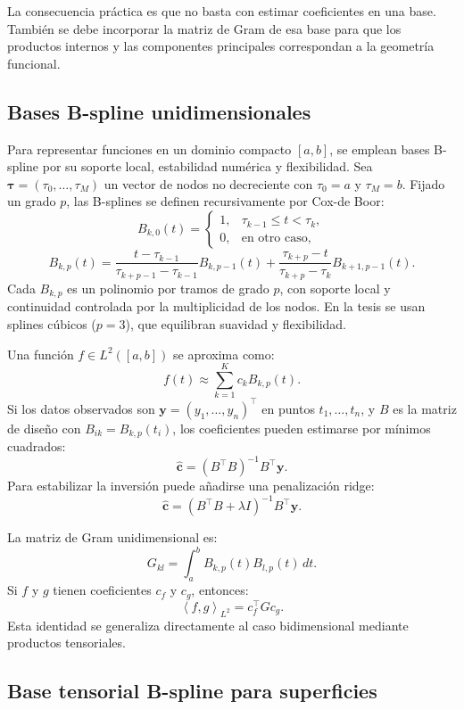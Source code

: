 \documentclass[a4paper,11pt]{article}
\newcommand{\inner}[2]{\left\langle #1,#2 \right\rangle}
\begin{document}
La consecuencia práctica es que no basta con estimar coeficientes en una base. También se debe incorporar la matriz de Gram de esa base para que los productos internos y las componentes principales correspondan a la geometría funcional.

\subsection{Bases B-spline unidimensionales}

Para representar funciones en un dominio compacto \([a,b]\), se emplean bases B-spline por su soporte local, estabilidad numérica y flexibilidad. Sea \(\boldsymbol{\tau}=(\tau_0,\ldots,\tau_M)\) un vector de nodos no decreciente con \(\tau_0=a\) y \(\tau_M=b\). Fijado un grado \(p\), las B-splines se definen recursivamente por Cox-de Boor:
\[
B_{k,0}(t)=
\begin{cases}
1, & \tau_{k-1}\leq t<\tau_k,\\
0, & \text{en otro caso},
\end{cases}
\]
\[
B_{k,p}(t)=
\frac{t-\tau_{k-1}}{\tau_{k+p-1}-\tau_{k-1}}B_{k,p-1}(t)
+
\frac{\tau_{k+p}-t}{\tau_{k+p}-\tau_k}B_{k+1,p-1}(t).
\]
Cada \(B_{k,p}\) es un polinomio por tramos de grado \(p\), con soporte local y continuidad controlada por la multiplicidad de los nodos. En la tesis se usan splines cúbicos (\(p=3\)), que equilibran suavidad y flexibilidad.

Una función \(f\in L^2([a,b])\) se aproxima como:
\[
  f(t)\approx \sum_{k=1}^{K} c_k B_{k,p}(t).
\]
Si los datos observados son \(\mathbf{y}=(y_1,\ldots,y_n)^\top\) en puntos \(t_1,\ldots,t_n\), y \(B\) es la matriz de diseño con \(B_{ik}=B_{k,p}(t_i)\), los coeficientes pueden estimarse por mínimos cuadrados:
\[
  \widehat{\mathbf{c}}=(B^\top B)^{-1}B^\top \mathbf{y}.
\]
Para estabilizar la inversión puede añadirse una penalización ridge:
\[
  \widehat{\mathbf{c}}=(B^\top B+\lambda I)^{-1}B^\top \mathbf{y}.
\]

La matriz de Gram unidimensional es:
\[
  G_{kl}=\int_a^b B_{k,p}(t)B_{l,p}(t)\,dt.
\]
Si \(f\) y \(g\) tienen coeficientes \(c_f\) y \(c_g\), entonces:
\[
  \inner{f}{g}_{L^2}=c_f^\top G c_g.
\]
Esta identidad se generaliza directamente al caso bidimensional mediante productos tensoriales.

\subsection{Base tensorial B-spline para superficies}
\end{document}
